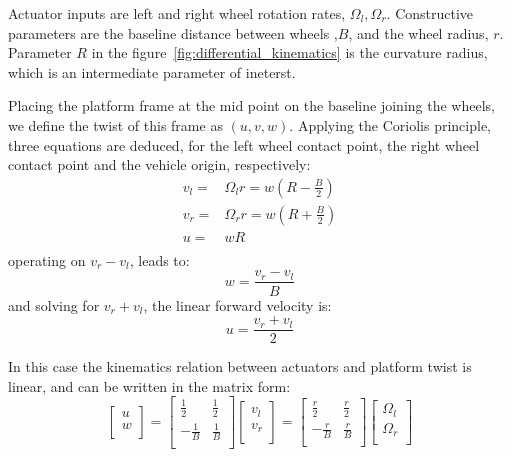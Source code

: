 Actuator inputs are left and right wheel rotation rates, $\Omega_l, \Omega_r$. Constructive parameters are the baseline distance between wheels ,$B$, and the wheel radius, $r$. Parameter $R$ in the figure~\ref{fig:differential_kinematics} is the curvature radius, which is an intermediate parameter of ineterst.

Placing the platform frame at the mid point on the baseline joining the wheels, we define the twist of this frame as $(u, v, w)$. Applying the Coriolis principle, three equations are deduced, for the left wheel contact point, the right wheel contact point and the vehicle origin, respectively:
\begin{align}
v_l = & \Omega_l r = w(R-\frac{B}{2}) \\
v_r = & \Omega_r r = w(R+\frac{B}{2}) \\
u = & wR \\
\end{align} 
operating on $v_r-v_l$, leads to:
\begin{equation}
w = \frac{v_r-v_l}{B}
\end{equation}
and solving for $v_r+v_l$, the linear forward velocity is:  
\begin{equation}
u = \frac{v_r+v_l}{2}
\end{equation}

In this case the kinematics relation between actuators and platform twist is linear, and can be written in the matrix form:
\begin{equation}
 \left[
 \begin{array}{c}
  u \\
  w \\
 \end{array}
 \right] = 
 \left[
 \begin{array}{cc}
  \frac{1}{2} & \frac{1}{2} \\
  -\frac{1}{B} & \frac{1}{B} \\
 \end{array}
 \right]
 \left[
 \begin{array}{c}
  v_l \\
  v_r \\
 \end{array}
 \right] = 
 \left[
 \begin{array}{cc}
  \frac{r}{2} & \frac{r}{2} \\
  -\frac{r}{B} & \frac{r}{B} \\
 \end{array}
 \right]
 \left[
 \begin{array}{c}
  \Omega_l \\
  \Omega_r \\
 \end{array}
 \right]
\end{equation}

